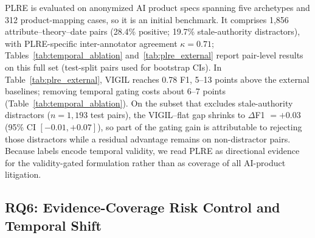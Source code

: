 PLRE is evaluated on anonymized AI product specs spanning five archetypes and 312 product-mapping cases, so it is an initial benchmark. It comprises 1{,}856 attribute--theory--date pairs (28.4\% positive; 19.7\% stale-authority distractors), with PLRE-specific inter-annotator agreement $\kappa=0.71$; Tables~\ref{tab:temporal_ablation} and~\ref{tab:plre_external} report pair-level results on this full set (test-split pairs used for bootstrap CIs). In Table~\ref{tab:plre_external}, VIGIL reaches 0.78 F1, 5--13 points above the external baselines; removing temporal gating costs about 6--7 points (Table~\ref{tab:temporal_ablation}). On the subset that excludes stale-authority distractors ($n{=}1{,}193$ test pairs), the VIGIL--flat gap shrinks to $\Delta$F1 ${=}{+}0.03$ (95\% CI $[{-}0.01,{+}0.07]$), so part of the gating gain is attributable to rejecting those distractors while a residual advantage remains on non-distractor pairs. Because labels encode temporal validity, we read PLRE as directional evidence for the validity-gated formulation rather than as coverage of all AI-product litigation.

\begin{table}[t]
\centering
\caption{PLRE comparison including external legal-NLI/precedent-retrieval baselines. External baselines do not use VIGIL's goal predicate or validity-interval closure. Point estimates without confidence intervals.}
\label{tab:plre_external}
\small
\setlength{\tabcolsep}{4pt}
\end{table}

\subsection{RQ6: Evidence-Coverage Risk Control and Temporal Shift}

